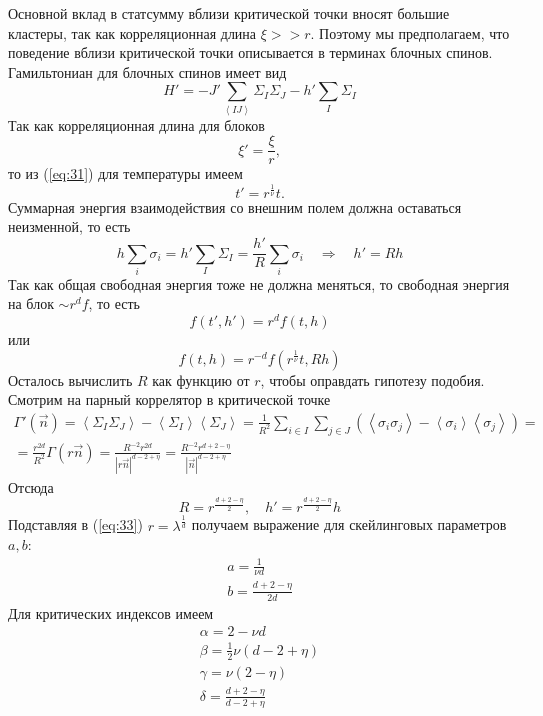 \documentclass[a4paper,12pt]{article}
\theoremstyle{definition}
\theoremstyle{definition}
\theoremstyle{definition}
\begin{document}
Основной вклад в статсумму вблизи критической точки вносят большие кластеры, так как корреляционная длина $\xi>>r$. Поэтому мы предполагаем, что поведение вблизи критической точки описывается в терминах блочных спинов. Гамильтониан для блочных спинов имеет вид
\begin{equation}
  \label{eq:42}
  H'=-J' \sum_{\left<IJ\right>} \Sigma_I \Sigma_J-h' \sum_I \Sigma_I
\end{equation}
Так как корреляционная длина для блоков
\begin{equation}
  \label{eq:43}
  \xi'=\frac{\xi}{r},
\end{equation}
то из (\ref{eq:31}) для температуры имеем
\begin{equation}
  \label{eq:44}
  t'=r^{\frac{1}{\nu}} t.
\end{equation}
Суммарная энергия взаимодействия со внешним полем должна оставаться неизменной, то есть
\begin{equation}
  \label{eq:45}
  h\sum_i \sigma_i=h' \sum_I \Sigma_I=\frac{h'}{R}\sum_i \sigma_i\quad\Longrightarrow\quad h'= Rh
\end{equation}
Так как общая свободная энергия тоже не должна меняться, то свободная энергия на блок $\sim r^d f$, то есть
\begin{equation}
  \label{eq:46}
  f(t',h')=r^d f(t,h)
\end{equation}
или
\begin{equation}
  \label{eq:47}
  f(t,h)=r^{-d} f(r^{\frac{1}{\nu}} t, Rh)
\end{equation}
Осталось вычислить $R$ как функцию от $r$, чтобы оправдать гипотезу подобия. Смотрим на парный коррелятор в критической точке
\begin{multline}
  \label{eq:48}
  \Gamma'(\vec n)=\left< \Sigma_I\Sigma_J\right>-\left< \Sigma_I\right>\left<\Sigma_J\right>=\frac{1}{R^2}\sum_{i\in I}\sum_{j\in J}\left(\left<\sigma_i \sigma_j\right>-\left<\sigma_i\right>\left<\sigma_j\right>\right) =\\
  = \frac{r^{2d}}{R^2}\Gamma(r\vec n)=\frac{R^{-2}r^{2d}}{\left|r\vec n\right|^{d-2+\eta}}=\frac{R^{-2}r^{d+2-\eta}}{\left|\vec n\right|^{d-2+\eta}}
\end{multline}
Отсюда
\begin{equation}
  \label{eq:49}
  R=r^{\frac{d+2-\eta}{2}}, \quad h'=r^{\frac{d+2-\eta}{2}}h
\end{equation}
Подставляя в (\ref{eq:33}) $r=\lambda^{\frac{1}{d}}$ получаем выражение для скейлинговых параметров $a,b$:
\begin{eqnarray}
  \label{eq:50}
  a=\frac{1}{\nu d}\\
  b=\frac{d+2-\eta}{2d}
\end{eqnarray}
Для критических индексов имеем
\begin{eqnarray}
  \label{eq:51}
  \alpha=2-\nu d\\
  \beta=\frac{1}{2}\nu (d-2+\eta)\\
  \gamma=\nu (2-\eta)\\
  \delta=\frac{d+2-\eta}{d-2+\eta}
\end{eqnarray}
\end{document}
